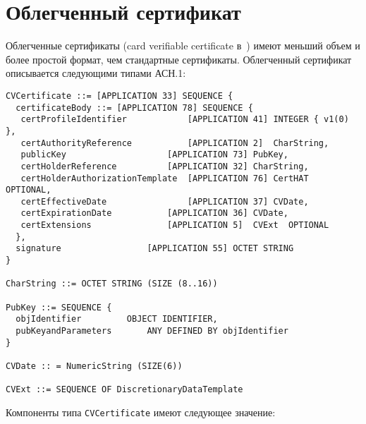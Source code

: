 \section{Облегченный сертификат}\label{CERTS.Light}

Облегченные сертификаты (card verifiable certificate в~\cite{LightCerts}) 
имеют меньший объем и более простой формат, чем стандартные сертификаты. 
Облегченный сертификат описывается следующими типами АСН.1: 

\begin{verbatim}
CVCertificate ::= [APPLICATION 33] SEQUENCE {
  certificateBody ::= [APPLICATION 78] SEQUENCE {
   certProfileIdentifier			[APPLICATION 41] INTEGER { v1(0) },
   certAuthorityReference			[APPLICATION 2]  CharString,
   publicKey					[APPLICATION 73] PubKey,
   certHolderReference			[APPLICATION 32] CharString,
   certHolderAuthorizationTemplate	[APPLICATION 76] CertHAT  OPTIONAL,
   certEffectiveDate				[APPLICATION 37] CVDate,
   certExpirationDate			[APPLICATION 36] CVDate,
   certExtensions				[APPLICATION 5]  CVExt  OPTIONAL 
  },
  signature					[APPLICATION 55] OCTET STRING
}

CharString ::= OCTET STRING (SIZE (8..16))

PubKey ::= SEQUENCE {
  objIdentifier			OBJECT IDENTIFIER,
  pubKeyandParameters		ANY DEFINED BY objIdentifier
}

CVDate :: = NumericString (SIZE(6))

CVExt ::= SEQUENCE OF DiscretionaryDataTemplate
\end{verbatim}

Компоненты типа \verb|CVCertificate| имеют следующее значение:

